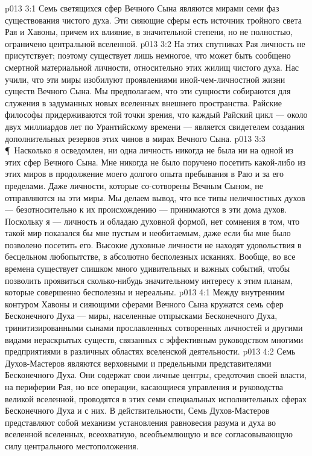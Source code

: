 \vs p013 3:1 Семь светящихся сфер Вечного Сына являются мирами семи фаз существования чистого духа. Эти сияющие сферы есть источник тройного света Рая и Хавоны, причем их влияние, в значительной степени, но не полностью, ограничено центральной вселенной.
\vs p013 3:2 На этих спутниках Рая личность не присутствует; поэтому существует лишь немногое, что может быть сообщено смертной материальной личности, относительно этих жилищ чистого духа. Нас учили, что эти миры изобилуют проявлениями иной\hyp{}чем\hyp{}личностной жизни существ Вечного Сына. Мы предполагаем, что эти сущности собираются для служения в задуманных новых вселенных внешнего пространства. Райские философы придерживаются той точки зрения, что каждый Райский цикл --- около двух миллиардов лет по Урантийскому времени --- является свидетелем создания дополнительных резервов этих чинов в мирах Вечного Сына.
\vs p013 3:3 \P\ Насколько я осведомлен, ни одна личность никогда не была ни на одной из этих сфер Вечного Сына. Мне никогда не было поручено посетить какой\hyp{}либо из этих миров в продолжение моего долгого опыта пребывания в Раю и за его пределами. Даже личности, которые со\hyp{}сотворены Вечным Сыном, не отправляются на эти миры. Мы делаем вывод, что все типы неличностных духов --- безотносительно к их происхождению --- принимаются в эти дома духов. Поскольку я --- личность и обладаю духовной формой, нет сомнения в том, что такой мир показался бы мне пустым и необитаемым, даже если бы мне было позволено посетить его. Высокие духовные личности не находят удовольствия в бесцельном любопытстве, в абсолютно бесполезных исканиях. Вообще, во все времена существует слишком много удивительных и важных событий, чтобы позволить проявиться сколько\hyp{}нибудь значительному интересу к этим планам, которые совершенно бесполезны и нереальны.
\vs p013 4:1 Между внутренним контуром Хавоны и сияющими сферами Вечного Сына кружатся семь сфер Бесконечного Духа --- миры, населенные отпрысками Бесконечного Духа, тринитизированными сынами прославленных сотворенных личностей и другими видами нераскрытых существ, связанных с эффективным руководством многими предприятиями в различных областях вселенской деятельности.
\vs p013 4:2 Семь Духов\hyp{}Мастеров являются верховными и предельными представителями Бесконечного Духа. Они содержат свои личные центры, средоточия своей власти, на периферии Рая, но все операции, касающиеся управления и руководства великой вселенной, проводятся в этих семи специальных исполнительных сферах Бесконечного Духа и с них. В действительности, Семь Духов\hyp{}Мастеров представляют собой механизм установления равновесия разума и духа во вселенной вселенных, всеохватную, всеобъемлющую и все согласовывающую силу центрального местоположения.
